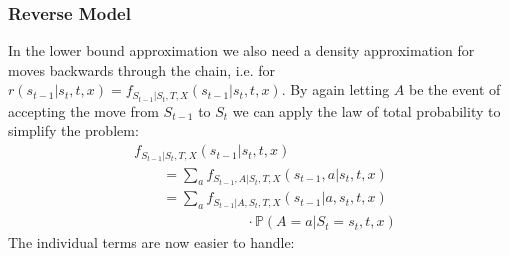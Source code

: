 \subsubsection{Reverse Model}
\label{sec:TransDensitiesWithAcceptReverse}
In the lower bound approximation we also need a density approximation for moves backwards through the chain, i.e. for $r(s_{t-1}|s_t, t, x) = f_{S_{t-1}|S_t,T, X}(s_{t-1} | s_t, t, x)$. By again letting $A$ be the event of accepting the move from $S_{t-1}$ to $S_t$ we can apply the law of total probability to simplify the problem:
\begin{equation}
\begin{split}
&f_{S_{t-1}|S_t, T, X}(s_{t-1} | s_t, t, x) \\
&\qquad = \sum_{a} f_{S_{t-1}, A|S_t, T, X}(s_{t-1}, a | s_t, t, x) \\
&\qquad = \sum_{a} f_{S_{t-1} |A, S_t, T, X}(s_{t-1} | a, s_t, t, x) \\
&\qquad\qquad\qquad\qquad \cdot \mathbb{P}(A = a | S_t = s_t, t, x)
\end{split}
\end{equation}
The individual terms are now easier to handle:
